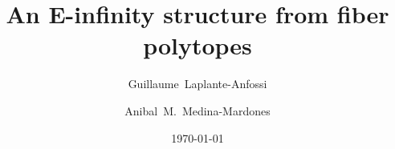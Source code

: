 \documentclass{amsart}
\title[Short title]{An E-infinity structure from fiber polytopes}
\author[G.~Laplante-Anfossi]{Guillaume~Laplante-Anfossi}
\author[A.~Medina-Mardones]{Anibal~M.~Medina-Mardones}
\date{\today}
\begin{document}
	
	\maketitle
	
	
	
	
	\nocite{*}
	\printbibliography
\end{document}
